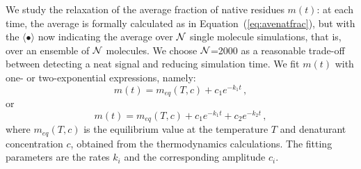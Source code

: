 We study the relaxation of the average fraction of native residues $m(t)$: at
each time, the average is formally calculated as in Equation~(\ref{eq:avenatfrac}),
but with the $\langle \bullet \rangle$ now indicating the average over  $\cal N$
single molecule simulations, that is, over an ensemble  of $\cal N$ molecules.
We choose  $\cal N$=2000 as a reasonable trade-off between detecting a neat
signal and reducing simulation time.  We fit $m(t)$  with one- or
two-exponential expressions, namely:
\begin{equation}
m(t)=m_{eq}(T,c) + c_1 e^{-k_1 t} \,,
\label{eq:1expfit} 
\end{equation}
or
\begin{equation}
m(t)=m_{eq}(T,c) + c_1 e^{-k_1 t} + c_2 e^{-k_2 t}\,,
\label{eq:2expfit} 
\end{equation}
where $m_{eq}(T,c)$ is the equilibrium value at the temperature  $T$ and
denaturant concentration $c$, obtained from the thermodynamics calculations. The
fitting parameters are the rates $k_i$ and the corresponding amplitude $c_i$.

